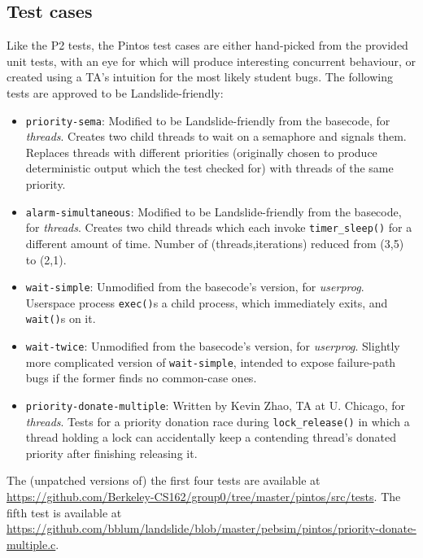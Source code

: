 \subsection{Test cases}
\label{sec:education-pintos-tests}

Like the P2 tests, the Pintos test cases are either hand-picked from the provided unit tests,
with an eye for which will produce interesting concurrent behaviour,
or created using a TA's intuition for the most likely student bugs.
The following tests are approved to be Landslide-friendly:

\begin{itemize}
	\item {\tt priority-sema}:
		Modified to be Landslide-friendly from the basecode, for {\em threads}.
		Creates two child threads to wait on a semaphore and signals them.
		Replaces threads with different priorities
		(originally chosen to produce deterministic output which the test checked for)
		with threads of the same priority.
	\item {\tt alarm-simultaneous}:
		Modified to be Landslide-friendly from the basecode, for {\em threads}.
		Creates two child threads which each invoke {\tt timer\_sleep()} for a different amount of time.
		Number of (threads,iterations) reduced from (3,5) to (2,1).
	\item {\tt wait-simple}:
		Unmodified from the basecode's version, for {\em userprog}.
		Userspace process {\tt exec()}s a child process, which immediately exits, and {\tt wait()}s on it.
	\item {\tt wait-twice}:
		Unmodified from the basecode's version, for {\em userprog}.
		Slightly more complicated version of {\tt wait-simple},
		intended to expose failure-path bugs if the former finds no common-case ones.
	\item {\tt priority-donate-multiple}:
		Written by Kevin Zhao, TA at U. Chicago, for {\em threads}.
		Tests for a priority donation race during {\tt lock\_release()}
		in which a thread holding a lock can accidentally keep a contending thread's donated priority
		after finishing releasing it.
\end{itemize}
\vspace{1em}

The (unpatched versions of) the first four tests are available at
\url{https://github.com/Berkeley-CS162/group0/tree/master/pintos/src/tests}.
The fifth test is available at
\url{https://github.com/bblum/landslide/blob/master/pebsim/pintos/priority-donate-multiple.c}.

